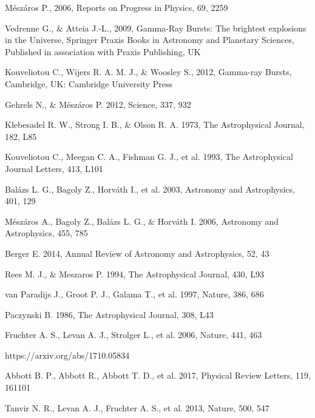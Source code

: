 \documentclass[12pt, a4paper,titlepage]{article}
\numberwithin{equation}{section}
\numberwithin{figure}{section}
\begin{document}
\begin{thebibliography}{99}

 Mészáros P., 2006, Reports on Progress in Physics, 69, 2259

 Vedrenne G., \& Atteia J.-L., 2009, Gamma-Ray Bursts: The brightest explosions in the Universe,
Springer Praxis Books in Astronomy and Planetary Sciences, Published in association with Praxis
Publishing, UK

 Kouveliotou C., Wijers R. A. M. J., \& Woosley S., 2012, Gamma-ray Bursts, Cambridge, UK:
Cambridge University Press

 Gehrels N., \& Mészáros P. 2012, Science, 337, 932

 Klebesadel R. W., Strong I. B., \& Olson R. A. 1973, The Astrophysical Journal, 182, L85

 Kouveliotou C., Meegan C. A., Fishman G. J., et al. 1993, The Astrophysical Journal Letters, 413, L101

 Balázs L. G., Bagoly Z., Horváth I., et al. 2003, Astronomy and Astrophysics, 401, 129

 Mészáros A., Bagoly Z., Balázs L. G., \& Horváth I. 2006, Astronomy and Astrophysics, 455, 785

 Berger E. 2014, Annual Review of Astronomy and Astrophysics, 52, 43

 Rees M. J., \& Meszaros P. 1994, The Astrophysical Journal, 430, L93

 van Paradijs J., Groot P. J., Galama T., et al. 1997, Nature, 386, 686

 Paczynski B. 1986, The Astrophysical Journal, 308, L43

 Fruchter A. S., Levan A. J., Strolger L., et al. 2006, Nature, 441, 463

 https://arxiv.org/abs/1710.05834

 Abbott B. P., Abbott R., Abbott T. D., et al. 2017, Physical Review Letters, 119, 161101

 Tanvir N. R., Levan A. J., Fruchter A. S., et al. 2013, Nature, 500, 547


\end{thebibliography}
\end{document}
